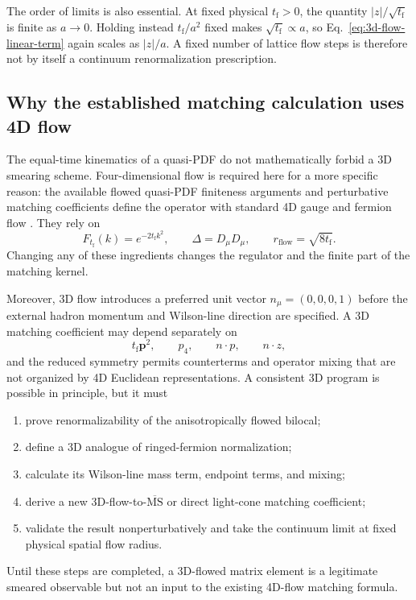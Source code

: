 \documentclass[11pt]{article}
\numberwithin{equation}{section}
\newcommand{\MSbar}{\overline{\mathrm{MS}}}
\newcommand{\rflow}{r_{\mathrm{flow}}}
\newcommand{\tf}{t_{\mathrm f}}
\begin{document}
The order of limits is also essential.  At fixed physical \(\tf>0\), the
quantity \(|z|/\sqrt{\tf}\) is finite as \(a\to0\).  Holding instead
\(\tf/a^2\) fixed makes \(\sqrt{\tf}\propto a\), so
Eq.~\eqref{eq:3d-flow-linear-term} again scales as \(|z|/a\).  A fixed number
of lattice flow steps is therefore not by itself a continuum
renormalization prescription.

\subsection{Why the established matching calculation uses 4D flow}

The equal-time kinematics of a quasi-PDF do not mathematically forbid a 3D
smearing scheme.  Four-dimensional flow is required here for a more specific
reason: the available flowed quasi-PDF finiteness arguments and perturbative
matching coefficients define the operator with standard 4D gauge and fermion
flow \cite{MonahanOrginos2017,Monahan2018}.  They rely on
\begin{equation}
  F_{\tf}(k)=e^{-2\tf k^2},
  \qquad
  \Delta=D_\mu D_\mu,
  \qquad
  \rflow=\sqrt{8\tf}.
  \label{eq:standard-flow-matching-contract}
\end{equation}
Changing any of these ingredients changes the regulator and the finite part
of the matching kernel.

Moreover, 3D flow introduces a preferred unit vector
\(n_\mu=(0,0,0,1)\) before the external hadron momentum and Wilson-line
direction are specified.  A 3D matching coefficient may depend separately on
\begin{equation}
  \tf\bm p^2,
  \qquad p_4,
  \qquad n\!\cdot p,
  \qquad n\!\cdot z,
\end{equation}
and the reduced symmetry permits counterterms and operator mixing that are
not organized by 4D Euclidean representations.  A consistent 3D program is
possible in principle, but it must
\begin{enumerate}
  \item prove renormalizability of the anisotropically flowed bilocal;
  \item define a 3D analogue of ringed-fermion normalization;
  \item calculate its Wilson-line mass term, endpoint terms, and mixing;
  \item derive a new 3D-flow-to-\(\MSbar\) or direct light-cone matching
        coefficient;
  \item validate the result nonperturbatively and take the continuum limit at
        fixed physical spatial flow radius.
\end{enumerate}
Until these steps are completed, a 3D-flowed matrix element is a legitimate
smeared observable but not an input to the existing 4D-flow matching formula.
\end{document}
